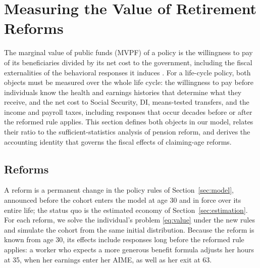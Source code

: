 \section{Measuring the Value of Retirement Reforms}\label{sec:framework}

The marginal value of public funds (MVPF) of a policy is the willingness to pay of its beneficiaries divided by its net cost to the government, including the fiscal externalities of the behavioral responses it induces \citep{hendren2016policy,hendren2020unified}. For a life-cycle policy, both objects must be measured over the whole life cycle: the willingness to pay before individuals know the health and earnings histories that determine what they receive, and the net cost to Social Security, DI, means-tested transfers, and the income and payroll taxes, including responses that occur decades before or after the reformed rule applies. This section defines both objects in our model, relates their ratio to the sufficient-statistics analysis of pension reform, and derives the accounting identity that governs the fiscal effects of claiming-age reforms.

\subsection{Reforms}

A reform is a permanent change in the policy rules of Section~\ref{sec:model}, announced before the cohort enters the model at age 30 and in force over its entire life; the status quo is the estimated economy of Section~\ref{sec:estimation}. For each reform, we solve the individual's problem \eqref{eq:value} under the new rules and simulate the cohort from the same initial distribution. Because the reform is known from age 30, its effects include responses long before the reformed rule applies: a worker who expects a more generous benefit formula adjusts her hours at 35, when her earnings enter her AIME, as well as her exit at 63.

